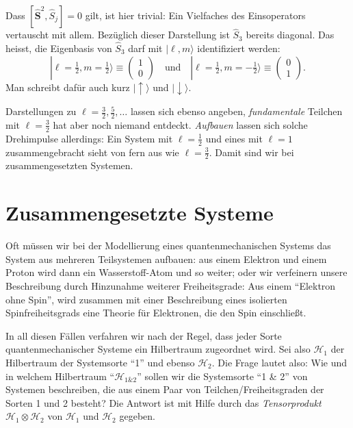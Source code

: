 Dass $[\widehat{\mathbf{S}}^2,\widehat{S}_j]=0$ gilt, ist hier trivial: Ein Vielfaches des Einsoperators vertauscht mit allem. Bezüglich dieser Darstellung ist $\widehat{S}_3$ bereits diagonal. Das heisst, die Eigenbasis von $\widehat{S}_3$ darf mit $|\ell,m\rangle$ identifiziert werden:
\begin{equation}
	|\ell=\tfrac12,m=\tfrac12\rangle \equiv \begin{pmatrix}
		1 \\ 0
	\end{pmatrix}\quad\text{und}\quad 
	|\ell=\tfrac12,m=-\tfrac12\rangle \equiv\begin{pmatrix}
		0 \\ 1
	\end{pmatrix}.
\end{equation}
Man schreibt dafür auch kurz $|\uparrow\rangle$ und $|\downarrow\rangle$.

Darstellungen zu $\ell=\frac32,\frac52,\ldots$ lassen sich ebenso angeben, \emph{fundamentale} Teilchen mit $\ell=\frac32$ hat aber noch niemand entdeckt. \emph{Aufbauen} lassen sich solche Drehimpulse allerdings: Ein System mit $\ell=\frac12$ und eines mit $\ell=1$ zusammengebracht sieht von fern aus wie $\ell=\frac32$. Damit sind wir bei zusammengesetzten Systemen.

\section*{Zusammengesetzte Systeme}
Oft müssen wir bei der Modellierung eines quantenmechanischen Systems das System aus mehreren Teilsystemen aufbauen: aus einem Elektron und einem Proton wird dann ein Wasserstoff-Atom und so weiter; oder wir verfeinern unsere Beschreibung durch Hinzunahme weiterer Freiheitsgrade: Aus einem ``Elektron ohne Spin'', wird zusammen mit einer Beschreibung eines isolierten Spinfreiheitsgrads eine Theorie für Elektronen, die den Spin einschließt.

In all diesen Fällen verfahren wir nach der Regel, dass jeder Sorte quantenmechanischer
Systeme ein Hilbertraum zugeordnet wird. Sei also $\mathcal{H}_1$ der Hilbertraum der Systemsorte ``1'' und ebenso $\mathcal{H}_2$. Die Frage lautet also: Wie und in welchem Hilbertraum ``$\mathcal{H}_{\text{$1$\&$2$}}$'' sollen wir die Systemsorte ``1 \& 2'' von Systemen beschreiben, die aus einem Paar von Teilchen/Freiheitsgraden der Sorten 1 und 2 besteht? Die Antwort ist mit Hilfe durch das \emph{Tensorprodukt} $\mathcal{H}_1\otimes \mathcal{H}_2$ von $\mathcal{H}_1$ und $\mathcal{H}_2$ gegeben.


